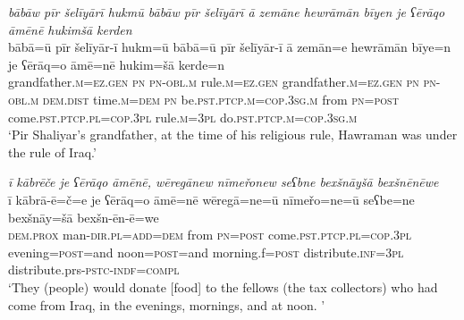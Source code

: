 \ea \label{BP.21}
\textit{bābāw pīr šelīyārī hukmū bābāw pīr šelīyārī ā zemāne hewrāmān bīyen je ʕērāqo āmēnē hukimšā kerden} \\ 
\gll bābā=ū pīr šelīyār-ī hukm=ū bābā=ū pīr šelīyār-ī ā zemān=e hewrāmān bīye=n je ʕērāq=o āmē=nē hukim=šā kerde=n \\ 
 grandfather\textsc{.m}\textsc{=ez.gen} \textsc{pn} \textsc{pn}\textsc{-obl}\textsc{.m} rule\textsc{.m}\textsc{=ez.gen} grandfather\textsc{.m}\textsc{=ez.gen} \textsc{pn} \textsc{pn}\textsc{-obl}\textsc{.m} \textsc{dem.dist} time\textsc{.m}\textsc{=dem} \textsc{pn} be\textsc{.pst}\textsc{.ptcp}\textsc{.m}\textsc{=cop}\textsc{.3sg}\textsc{.m} from \textsc{pn}\textsc{=\textsc{post}} come\textsc{.pst}\textsc{.ptcp}\textsc{.pl}\textsc{=cop}\textsc{.3pl} rule\textsc{.m}\textsc{=3pl} do\textsc{.pst}\textsc{.ptcp}\textsc{.m}\textsc{=cop}\textsc{.3sg}\textsc{.m} \\ 
\glt `Pir Shaliyar’s grandfather, at the time of his religious rule, Hawraman was under the rule of Iraq.'
\z 
 
\ea \label{BP.38}
\textit{ī kābrēče je ʕērāqo āmēnē, wēregānew nīmeřonew seʕbne bexšnāyšā bexšnēnēwe} \\ 
\gll ī kābrā-ē=č=e je ʕērāq=o āmē=nē wēregā=ne=ū nīmeřo=ne=ū seʕbe=ne bexšnāy=šā bexšn-ēn-ē=we \\ 
 \textsc{dem.prox} man\textsc{-dir}\textsc{.pl}\textsc{=add}\textsc{=dem} from \textsc{pn}\textsc{=\textsc{post}} come\textsc{.pst}\textsc{.ptcp}\textsc{.pl}\textsc{=cop}\textsc{.3pl} evening\textsc{=\textsc{post}}=and noon\textsc{=\textsc{post}}=and morning.f\textsc{=\textsc{post}} distribute\textsc{.inf}\textsc{=3pl} distribute.prs\textsc{-pstc}\textsc{-indf}\textsc{=compl} \\ 
\glt `They (people) would donate [food] to the fellows (the tax collectors) who had come from Iraq, in the evenings, mornings, and at noon. '
\z 
 
